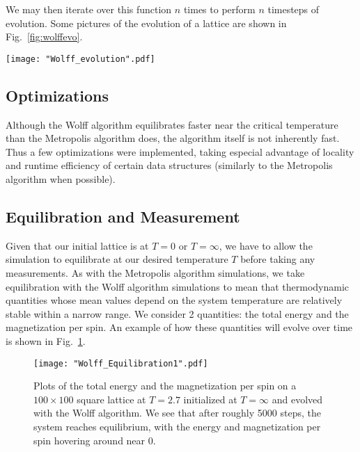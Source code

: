 \documentclass[twocolumn,aps]{revtex4-1} %
\begin{document}
We may then iterate over this function $n$ times to perform $n$ timesteps of evolution. Some pictures of the evolution of a lattice are shown in Fig.~\ref{fig:wolffevo}.
\begin{figure*}
	\texttt{[image: "Wolff\_evolution".pdf]}
	\caption{\label{fig:wolffevo}The evolution of a $100 \times 100$ square lattice at $T = 2.4$ via the Wolff algorithm. The sequence is ordered from left to right, top to bottom. The two spin states $+1$ and $-1$ correspond to black and white, respectively. We have initialized the system in the $T = 0$ state, and plotted the system after 0, 1, 5, 10, 20, 50, 100, 500, and 1000 Monte Carlo steps. The lattice equilibrates much faster through the Wolff algorithm than through the Metropolis algorithm.}
\end{figure*}

\subsection{Optimizations}
Although the Wolff algorithm equilibrates faster near the critical temperature than the Metropolis algorithm does, the algorithm itself is not inherently fast. Thus a few optimizations were implemented, taking especial advantage of locality and runtime efficiency of certain data structures (similarly to the Metropolis algorithm when possible).

\subsection{Equilibration and Measurement}
Given that our initial lattice is at $T = 0$ or $T = \infty$, we have to allow the simulation to equilibrate at our desired temperature $T$ before taking any measurements. As with the Metropolis algorithm simulations, we take equilibration with the Wolff algorithm simulations to mean that thermodynamic quantities whose mean values depend on the system temperature are relatively stable within a narrow range. We consider 2 quantities: the total energy and the magnetization per spin. An example of how these quantities will evolve over time is shown in Fig.~\ref{fig:equil}. 
\begin{figure}
	\texttt{[image: "Wolff\_Equilibration1".pdf]}
	\caption{\label{fig:equil}Plots of the total energy and the magnetization per spin on a $100 \times 100$ square lattice at $T = 2.7$ initialized at $T = \infty$ and evolved with the Wolff algorithm. We see that after roughly 5000 steps, the system reaches equilibrium, with the energy and magnetization per spin hovering around near $0$.}
\end{figure}
\end{document}
